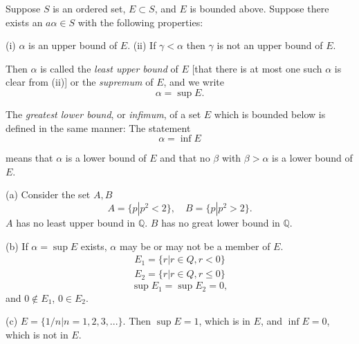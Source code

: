 \begin{myDefinition}\label{myDefinition:1.8}
Suppose $S$ is an ordered set, $E \subset S$, and $E$ is bounded above.
Suppose there exists an $a\alpha \in S$ with the following properties:

(i) $\alpha$ is an upper bound of $E$.
(ii) If $\gamma <\alpha$ then $\gamma$ is not an upper bound of $E$.

Then $\alpha$ is called the \emph{least upper bound} of $E$ [that there is at most one such
$\alpha$ is clear from (ii)] or the \emph{supremum} of $E$, and we write
\begin{equation*}
    \alpha = \sup E.
\end{equation*}

The \emph{greatest lower bound}, or \emph{infimum}, of a set $E$ which is bounded below
is defined in the same manner: The statement
\begin{equation*}
    \alpha = \inf E
\end{equation*}

means that $\alpha$ is a lower bound of $E$ and that no $\beta$ with $\beta > \alpha$ is a lower bound
of $E$.
\end{myDefinition}

\begin{myExample}\label{Example:1.9}
(a) Consider the set $A, B$
    \begin{equation*}
        A = \{p|p^2 < 2\},\quad
        B = \{p|p^2 > 2\}.
    \end{equation*}
    $A$ has no least upper bound in $\mathbb{Q}$.
    $B$ has no great lower bound in $\mathbb{Q}$.
    
    (b) If $\alpha = \sup E$ exists, $\alpha$ may be or may not be a member of $E$.
    \begin{align*}
        E_1 = \{r |r\in Q, r < 0\}\\
        E_2 = \{r |r\in Q, r \leq 0\}
    \end{align*}
    \begin{equation*}
        \sup E_1 = \sup E_2 = 0,
    \end{equation*}
    and $0\not\in E_1$, $0\in E_2$.
    
    (c) $E = \{1/n | n = 1,2,3,...\}$. Then $\sup E = 1$, which is in $E$, and $\inf E = 0$, which is not in $E$.
\end{myExample}

